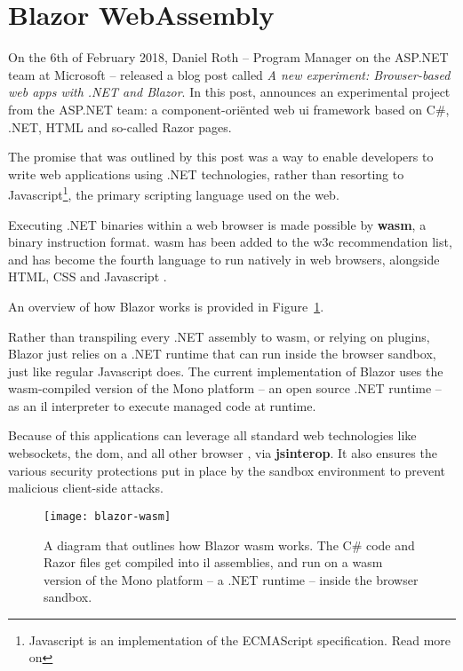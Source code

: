 \section{Blazor WebAssembly}

On the 6th of February 2018, Daniel Roth -- Program Manager on the ASP.NET team
at Microsoft -- released a blog post called \textit{A new experiment:
Browser-based web apps with .NET and Blazor}. In this post, \textcite{Roth_2018}
announces an experimental project from the ASP.NET team: a component-ori\"ented
web \gls{ui} framework based on C\#, .NET, HTML and so-called Razor pages. 

The promise that was outlined by this post was a way to enable developers to
write web applications using .NET technologies, rather than resorting to
Javascript\footnote{Javascript is an implementation of the ECMAScript
specification. Read more on }, the
primary scripting language used on the web.

Executing .NET binaries within a web browser is made possible by
\textbf{\gls{wasm}}, a binary instruction format.
\Gls{wasm} has been added to the \gls{w3c} recommendation list, and has become
the fourth language to run natively in web browsers, alongside HTML, CSS and
Javascript \autocite{Couriol_2019}. 

An overview of how Blazor works is provided in Figure~\ref{fig:blazor-wasm}.

Rather than \gls{transpiling} every .NET assembly to \gls{wasm}, or relying on
plugins, Blazor just relies on a .NET runtime that can run inside the browser
sandbox, just like regular Javascript does. The current implementation of Blazor
uses the \gls{wasm}-compiled version of the
Mono platform -- an open source .NET
runtime -- as an \gls{il} interpreter to execute managed code at runtime.

Because of this applications can leverage all standard web technologies like
websockets, the \gls{dom}, and all other browser , via
\textbf{\gls{jsinterop}}. It also ensures the various security protections put
in place by the sandbox environment to prevent malicious client-side attacks.

\begin{figure}
  \centering
  \texttt{[image: blazor-wasm]}
  \caption[Blazor WebAssembly]{A diagram that outlines how Blazor \gls{wasm}
  works. The C\# code and Razor files get compiled into \gls{il} assemblies, and
  run on a \gls{wasm} version of the Mono platform -- a .NET runtime -- inside
  the browser sandbox.}
  \label{fig:blazor-wasm}
\end{figure}


